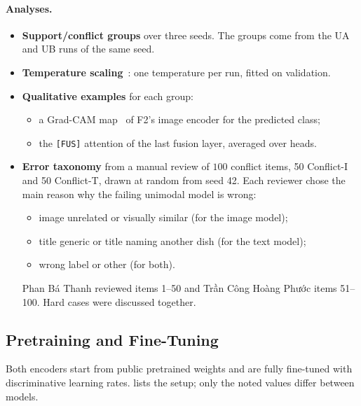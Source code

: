 \paragraph{Analyses.}
\begin{itemize}
  \item \textbf{Support/conflict groups} over three seeds. The groups come from the UA and UB runs of the same seed.
  \item \textbf{Temperature scaling}~\cite{guo2017calibration}: one temperature per run, fitted on validation.
  \item \textbf{Qualitative examples} for each group:
        \begin{itemize}
          \item a Grad-CAM map~\cite{selvaraju2017gradcam} of F2's image encoder for the predicted class;
          \item the \texttt{[FUS]} attention of the last fusion layer, averaged over heads.
        \end{itemize}
  \item \textbf{Error taxonomy} from a manual review of $100$ conflict items, 50 Conflict-I and 50 Conflict-T,
        drawn at random from seed 42. Each reviewer chose the main reason why the failing unimodal model is wrong:
        \begin{itemize}
          \item image unrelated or visually similar (for the image model);
          \item title generic or title naming another dish (for the text model);
          \item wrong label or other (for both).
        \end{itemize}
        Phan Bá Thanh reviewed items 1--50 and Trần Công Hoàng Phước items 51--100. Hard cases were discussed
        together.
\end{itemize}

\subsection{Pretraining and Fine-Tuning}
\label{sec:training}

Both encoders start from public pretrained weights and are fully fine-tuned with discriminative learning rates.
 lists the setup; only the noted values differ between models.

